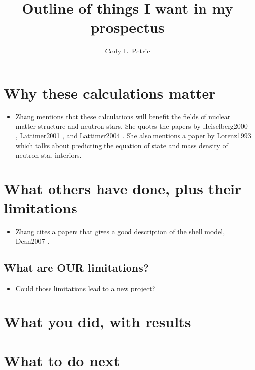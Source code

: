 \documentclass[12pt]{article}
\title{Outline of things I want in my prospectus}
\author{Cody L. Petrie}
\begin{document}
\maketitle

\section{Why these calculations matter}
\begin{itemize}
   \item Zhang \cite{zhang2014} mentions that these calculations will benefit the fields of nuclear matter structure and neutron stars. She quotes the papers by
Heiselberg2000 \cite{heiselberg2000}, Lattimer2001 \cite{lattimer2001}, and Lattimer2004 \cite{lattimer2004}. She also mentions a paper by Lorenz1993 \cite{lorenz1993} which talks about predicting the equation of state and mass density of neutron star interiors.
\end{itemize}

\section{What others have done, plus their limitations}
\begin{itemize}
   \item Zhang \cite{zhang2014} cites a papers that gives a good description of the shell model, Dean2007 \cite{dean2007}.
\end{itemize}
\subsection{What are OUR limitations?}
\begin{itemize}
   \item Could those limitations lead to a new project?
\end{itemize}

\section{What you did, with results}

\section{What to do next}



\end{document}
